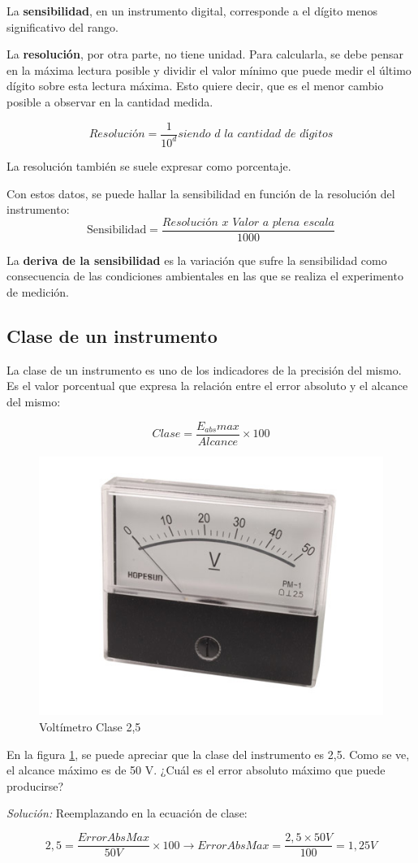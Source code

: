 La \textbf{sensibilidad}, en un instrumento digital, corresponde a el dígito menos significativo del rango.

La \textbf{resolución}, por otra parte, no tiene unidad. Para calcularla, se debe pensar en la máxima lectura posible y dividir el valor mínimo que puede medir el último dígito sobre esta lectura máxima. Esto quiere decir, que es el menor cambio posible a observar en la cantidad medida. 

$$ \textit{Resolución} = \frac{1}{10^{d}} \textit{siendo $d$ la cantidad de dígitos}$$

La resolución también se suele expresar como porcentaje.

Con estos datos, se puede hallar la sensibilidad en función de la resolución del instrumento:
$$ \text{Sensibilidad} = \frac{\textit{Resolución x Valor a plena escala}}{1000} $$

La \textbf{deriva de la sensibilidad} es la variación que sufre la sensibilidad como consecuencia de las condiciones ambientales en las que se realiza el experimento de medición.

\subsection{Clase de un instrumento}
La clase de un instrumento es uno de los indicadores de la precisión del mismo. Es el valor porcentual que expresa la relación entre el error absoluto y el alcance del mismo:

$$ Clase = \frac{E_{abs}max}{Alcance}\times 100 $$
\begin{figure}
	\includegraphics[scale=0.7]{images/volt_clase}
	\caption{Voltímetro Clase 2,5}
	\label{fig:voltclase}
\end{figure}
\begin{ejemplo}
	En la figura \ref{fig:voltclase}, se puede apreciar que la clase del instrumento es 2,5. Como se ve, el alcance máximo es de 50 V. ¿Cuál es el error absoluto máximo que puede producirse?
	
	\emph{Solución:} Reemplazando en la ecuación de clase:
	
	$$ 2,5 = \frac{ErrorAbsMax}{50 V} \times 100 
	\rightarrow
	ErrorAbsMax = \frac{2,5 \times 50V}{100} = 1,25 V $$
	
	
\end{ejemplo}

